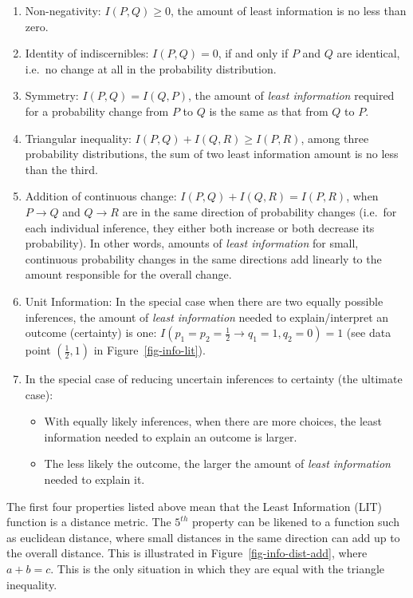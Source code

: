 \documentclass[
  letterpaper,
]{scrbook}
\begin{document}
\begin{enumerate}
\def\labelenumi{\arabic{enumi}.}
\item
  Non-negativity: \(I(P,Q) \ge 0\), the amount of least information is
  no less than zero.
\item
  Identity of indiscernibles: \(I(P,Q)=0\), if and only if \(P\) and
  \(Q\) are identical, i.e.~no change at all in the probability
  distribution.
\item
  Symmetry: \(I(P,Q)=I(Q,P)\), the amount of \emph{least information}
  required for a probability change from \(P\) to \(Q\) is the same as
  that from \(Q\) to \(P\).
\item
  Triangular inequality: \(I(P,Q) + I(Q,R) \ge I(P,R)\), among three
  probability distributions, the sum of two least information amount is
  no less than the third.
\item
  Addition of continuous change: \(I(P,Q) + I(Q,R) = I(P,R)\), when
  \(P \to Q\) and \(Q \to R\) are in the same direction of probability
  changes (i.e.~for each individual inference, they either both increase
  or both decrease its probability). In other words, amounts of
  \emph{least information} for small, continuous probability changes in
  the same directions add linearly to the amount responsible for the
  overall change.
\item
  Unit Information: In the special case when there are two equally
  possible inferences, the amount of \emph{least information} needed to
  explain/interpret an outcome (certainty) is one:
  \(I(p_1=p_2=\frac{1}{2} \to q_1 =1,q_2=0) = 1\) (see data point
  \((\frac{1}{2},1)\) in Figure~\ref{fig-info-lit}).
\item
  In the special case of reducing uncertain inferences to certainty (the
  ultimate case):

  \begin{itemize}
  \item
    With equally likely inferences, when there are more choices, the
    least information needed to explain an outcome is larger.
  \item
    The less likely the outcome, the larger the amount of \emph{least
    information} needed to explain it.
  \end{itemize}
\end{enumerate}

The first four properties listed above mean that the Least Information
(LIT) function is a distance metric. The \(5^{th}\) property can be
likened to a function such as euclidean distance, where small distances
in the same direction can add up to the overall distance. This is
illustrated in Figure~\ref{fig-info-dist-add}, where \(a+b=c\). This is
the only situation in which they are equal with the triangle inequality.
\end{document}
